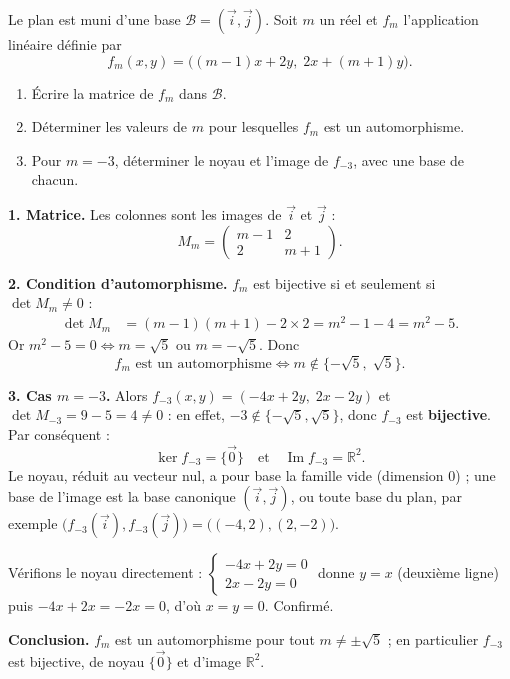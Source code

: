 \documentclass[11pt]{article}
\begin{document}
\begin{exoresolu}
Le plan est muni d'une base $\mathcal{B} = (\vec{i}, \vec{j})$. Soit $m$ un réel et $f_m$ l'application linéaire définie par
\[ f_m(x, y) = \big((m-1)x + 2y,\; 2x + (m+1)y\big). \]
\begin{enumerate}
\item Écrire la matrice de $f_m$ dans $\mathcal{B}$.
\item Déterminer les valeurs de $m$ pour lesquelles $f_m$ est un automorphisme.
\item Pour $m = -3$, déterminer le noyau et l'image de $f_{-3}$, avec une base de chacun.
\end{enumerate}
\tcblower
\textbf{1. Matrice.} Les colonnes sont les images de $\vec{i}$ et $\vec{j}$ :
\[ M_m = \begin{pmatrix} m-1 & 2 \\ 2 & m+1 \end{pmatrix}. \]

\textbf{2. Condition d'automorphisme.} $f_m$ est bijective si et seulement si $\det M_m \neq 0$ :
\begin{align*}
\det M_m &= (m-1)(m+1) - 2 \times 2 = m^2 - 1 - 4 = m^2 - 5.
\end{align*}
Or $m^2 - 5 = 0 \iff m = \sqrt{5}$ ou $m = -\sqrt{5}$. Donc
\[ f_m \text{ est un automorphisme} \iff m \notin \{-\sqrt{5},\; \sqrt{5}\}. \]

\textbf{3. Cas $m = -3$.} Alors $f_{-3}(x, y) = (-4x + 2y,\; 2x - 2y)$ et $\det M_{-3} = 9 - 5 = 4 \neq 0$ : en effet, $-3 \notin \{-\sqrt{5}, \sqrt{5}\}$, donc $f_{-3}$ est \textbf{bijective}. Par conséquent :
\[ \ker f_{-3} = \{\vec{0}\} \quad \text{et} \quad \operatorname{Im} f_{-3} = \mathbb{R}^2. \]
Le noyau, réduit au vecteur nul, a pour base la famille vide (dimension $0$) ; une base de l'image est la base canonique $(\vec{i}, \vec{j})$, ou toute base du plan, par exemple $\big(f_{-3}(\vec{i}), f_{-3}(\vec{j})\big) = \big((-4, 2), (2, -2)\big)$.

Vérifions le noyau directement : $\begin{cases} -4x + 2y = 0 \\ 2x - 2y = 0 \end{cases}$ donne $y = x$ (deuxième ligne) puis $-4x + 2x = -2x = 0$, d'où $x = y = 0$. Confirmé.

\textbf{Conclusion.} $f_m$ est un automorphisme pour tout $m \neq \pm\sqrt{5}$ ; en particulier $f_{-3}$ est bijective, de noyau $\{\vec{0}\}$ et d'image $\mathbb{R}^2$.
\end{exoresolu}
\end{document}
